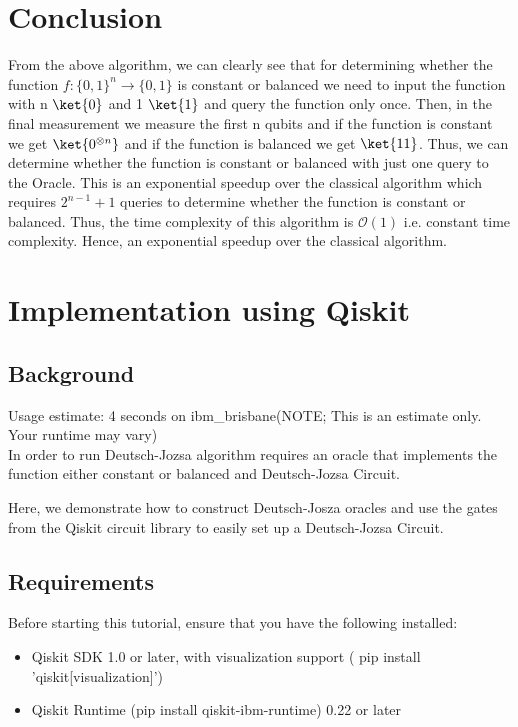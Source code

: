 \documentclass[12pt, oneside]{book}
\theoremstyle{definition}
\theoremstyle{definition}
\theoremstyle{remark}
\begin{document}
\section{Conclusion}
From the above algorithm, we can clearly see that for determining whether the 
function $f:\{0,1\}^n \rightarrow \{0,1\}$ is constant or balanced we need to input the function with n $\ket{0}$ and 1 $\ket{1}$ and query the function only once.
Then, in the final measurement we measure the first n qubits and if the function is constant we get $\ket{0^{\otimes n}}$ and if the function is balanced we get $\ket{11}$.
Thus, we can determine whether the function is constant or balanced with just one query to the Oracle. This is an exponential speedup over the classical algorithm which requires $2^{n-1}+1$ queries to determine whether the function is constant or balanced.
Thus, the time complexity of this algorithm is $\mathcal{O}(1)$ i.e. constant time complexity. Hence, an exponential speedup over the classical algorithm.

\section{Implementation using Qiskit}
\subsection{Background}
Usage estimate: 4 seconds on ibm\_brisbane(NOTE; This is an estimate only. Your runtime may vary)\\
In order to run Deutsch-Jozsa algorithm requires an oracle that implements the function either constant or balanced and Deutsch-Jozsa Circuit.

Here, we demonstrate how to construct Deutsch-Josza oracles and use the gates from the Qiskit circuit library to easily set up a Deutsch-Jozsa Circuit.

\subsection{Requirements}
Before starting this tutorial, ensure that you have the following installed:
\begin{itemize}
    \item Qiskit SDK 1.0 or later, with visualization support ( pip install 'qiskit[visualization]')
    \item Qiskit Runtime (pip install qiskit-ibm-runtime) 0.22 or later
\end{itemize}
\end{document}
